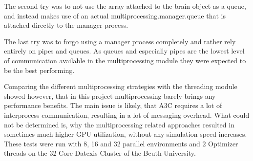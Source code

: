The second try was to not use the array attached to the brain object as a queue, and instead makes use of an actual multiprocessing.manager.queue that is attached directly to the manager process.

The last try was to forgo using a manager process completely and rather rely entirely on pipes and queues. As queues and especially pipes are the lowest level of communication available in the multiprocessing module they were expected to be the best performing.

Comparing the different multiprocessing strategies with the threading module showed however, that in this project multiprocessing barely brings any performance benefits. The main issue is likely, that A3C requires a lot of interprocess communication, resulting in a lot of messaging overhead. What could not be determined is, why the multiprocessing related approaches resulted in sometimes much higher GPU utilization, without any simulation speed increases.
These tests were run with 8, 16 and 32 parallel environments and 2 Optimizer threads on the 32 Core Datexis Cluster of the Beuth University.


